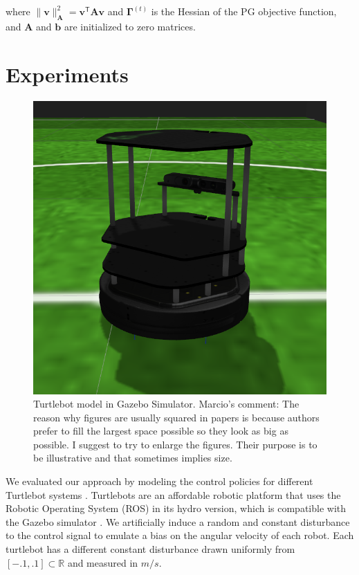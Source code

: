 \documentclass{aamas2016}
\renewcommand{\Re}{\mathbb{R}}
\newcommand{\transpose}{\text{$\mathsf{T}$}}
\begin{document}
where $\|\boldsymbol{v}\|_{\boldsymbol{A}}^{2}=\boldsymbol{v}^{\transpose}\boldsymbol{A}\boldsymbol{v}$ and $\boldsymbol{\Gamma}^{(t)}$ is 
the Hessian of the PG objective function, and $\boldsymbol{A}$ and $\boldsymbol{b}$ are initialized to zero matrices.


\section{Experiments} \label{Experiments}

\begin{figure}[!htbp]
    \centering
        \includegraphics[width=.45\textwidth]{images/turtlebot_crop.png}
        \caption{Turtlebot model in Gazebo Simulator. {\color{red} Marcio's comment: The reason why figures are usually squared in papers
        is because authors prefer to fill the largest space possible so they look as big as possible. I suggest to try to enlarge the figures.
        Their purpose is to be illustrative and that sometimes implies size.}}\label{fig:gazebo}
\end{figure}

We evaluated our approach by modeling the control policies for different Turtlebot systems \cite{Turtlebot-2016}.
Turtlebots are an affordable robotic platform that uses the Robotic Operating System (ROS) in its hydro version,
which is compatible with the Gazebo simulator \cite{Gazebo-2016,ROS-2016}. We artificially induce a random and
constant disturbance to the control signal to emulate a bias on the angular velocity of each robot. 
Each turtlebot has a different constant disturbance drawn uniformly from 
$[-.1, .1] \subset \Re$ and measured in $m/s$. 
\end{document}
